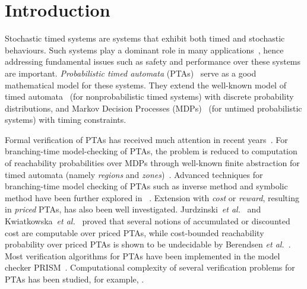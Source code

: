 \vspace{-2em}
\section{Introduction}
\vspace{-1em}
Stochastic timed systems are systems that exhibit both timed and stochastic behaviours.
Such systems play a dominant role in many applications~\cite{DBLP:books/daglib/0020348}, hence
addressing fundamental issues such as safety and performance over these systems are important.
\emph{Probabilistic timed automata} (PTAs)~\cite{DBLP:journals/fmsd/NormanPS13,DBLP:journals/tcs/Beauquier03,DBLP:journals/tcs/KwiatkowskaNSS02} serve as a good mathematical model for these systems.
They extend the well-known model of timed automata~\cite{DBLP:journals/tcs/AlurD94} (for nonprobabilistic timed systems) with discrete probability distributions, and Markov Decision Processes (MDPs)~\cite{PutermanMDP} (for untimed probabilistic systems) with timing constraints.

Formal verification of PTAs has received much attention in recent years~\cite{DBLP:journals/fmsd/NormanPS13}.
For branching-time model-checking of PTAs, the problem is reduced to computation of reachability probabilities over MDPs through well-known finite abstraction for timed automata (namely \emph{regions} and \emph{zones})~\cite{JensenPTA,DBLP:journals/tcs/Beauquier03,DBLP:journals/tcs/KwiatkowskaNSS02}.
Advanced techniques for branching-time model checking of PTAs such as inverse method and symbolic method have been further explored in  ~\cite{DBLP:journals/fmsd/AndreFS13,DBLP:journals/iandc/KwiatkowskaNSW07,DBLP:conf/formats/KwiatkowskaNP09,DBLP:conf/formats/JovanovicKN15}.
Extension with \emph{cost} or \emph{reward}, resulting in \emph{priced} PTAs, has also been well investigated.
Jurdzinski~\emph{et al.}~\cite{DBLP:conf/concur/JurdzinskiKNT09} and Kwiatkowska~\emph{et al.}~\cite{DBLP:journals/fmsd/KwiatkowskaNPS06} proved that several notions of accumulated or discounted cost are computable over priced PTAs, while
cost-bounded reachability probability over priced PTAs is shown to be undecidable by Berendsen \emph{et al.}~\cite{DBLP:conf/tamc/BerendsenCJ09}.
Most verification algorithms for PTAs have been implemented in the model checker PRISM~\cite{DBLP:conf/cav/KwiatkowskaNP11}. Computational complexity of several verification problems for PTAs has been studied, for example, \cite{DBLP:journals/ipl/LaroussinieS07,DBLP:journals/lmcs/JurdzinskiSL08,DBLP:conf/concur/JurdzinskiKNT09}.


